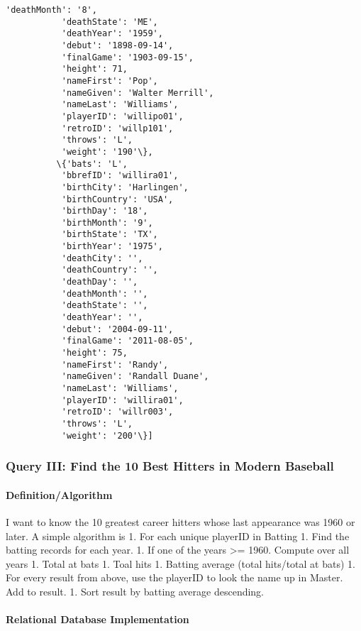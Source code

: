 \documentclass[11pt]{article}
\begin{document}
\begin{Verbatim}[commandchars=\\\{\}]
           'deathMonth': '8',
           'deathState': 'ME',
           'deathYear': '1959',
           'debut': '1898-09-14',
           'finalGame': '1903-09-15',
           'height': 71,
           'nameFirst': 'Pop',
           'nameGiven': 'Walter Merrill',
           'nameLast': 'Williams',
           'playerID': 'willipo01',
           'retroID': 'willp101',
           'throws': 'L',
           'weight': '190'\},
          \{'bats': 'L',
           'bbrefID': 'willira01',
           'birthCity': 'Harlingen',
           'birthCountry': 'USA',
           'birthDay': '18',
           'birthMonth': '9',
           'birthState': 'TX',
           'birthYear': '1975',
           'deathCity': '',
           'deathCountry': '',
           'deathDay': '',
           'deathMonth': '',
           'deathState': '',
           'deathYear': '',
           'debut': '2004-09-11',
           'finalGame': '2011-08-05',
           'height': 75,
           'nameFirst': 'Randy',
           'nameGiven': 'Randall Duane',
           'nameLast': 'Williams',
           'playerID': 'willira01',
           'retroID': 'willr003',
           'throws': 'L',
           'weight': '200'\}]
\end{Verbatim}
            
    \subsubsection{Query III: Find the 10 Best Hitters in Modern
Baseball}\label{query-iii-find-the-10-best-hitters-in-modern-baseball}

\paragraph{Definition/Algorithm}\label{definitionalgorithm}

I want to know the 10 greatest career hitters whose last appearance was
1960 or later. A simple algorithm is 1. For each unique playerID in
Batting 1. Find the batting records for each year. 1. If one of the
years \textgreater{}= 1960. Compute over all years 1. Total at bats 1.
Toal hits 1. Batting average (total hits/total at bats) 1. For every
result from above, use the playerID to look the name up in Master. Add
to result. 1. Sort result by batting average descending.

    \paragraph{Relational Database
Implementation}\label{relational-database-implementation}
\end{document}
